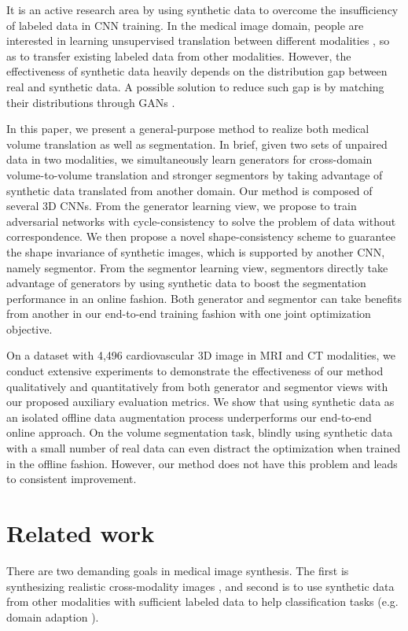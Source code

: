 \documentclass[10pt,twocolumn,letterpaper]{article}
\begin{document}
It is an active research area by using synthetic data to overcome the insufficiency of labeled data in CNN training. 
In the medical image domain, people are interested in learning unsupervised translation between different modalities \cite{kamnitsas2017unsupervised}, so as to transfer existing labeled data from other modalities. 
However, the effectiveness of synthetic data heavily depends on the distribution gap between real and synthetic data.
A possible solution to reduce such gap is by matching their distributions through GANs \cite{shrivastava2016learning,bousmalis2016unsupervised}.

In this paper, we present a general-purpose method to realize both medical volume translation as well as segmentation. In brief, given two sets of unpaired data in two modalities, we simultaneously learn generators for cross-domain volume-to-volume translation and stronger segmentors by taking advantage of synthetic data translated from another domain.
Our method is composed of several 3D CNNs. 
From the generator learning view, we propose to train adversarial networks with cycle-consistency \cite{zhu2017unpaired} to solve the problem of data without correspondence. 
We then propose a novel shape-consistency scheme to guarantee the shape invariance of synthetic images, which is supported by another CNN, namely segmentor. From the segmentor learning view, segmentors directly take advantage of generators by using synthetic data to boost the segmentation performance in an online fashion. Both generator and segmentor can take benefits from another in our end-to-end training fashion with one joint optimization objective.

On a dataset with 4,496 cardiovascular 3D image in MRI and CT modalities, we conduct extensive experiments to demonstrate the effectiveness of our method qualitatively and quantitatively from both generator and segmentor views with our proposed auxiliary evaluation metrics.
We show that using synthetic data as an isolated offline data augmentation process underperforms our end-to-end online approach. 
On the volume segmentation task, blindly using synthetic data with a small number of real data can even distract the optimization when trained in the offline fashion. However, our method does not have this problem and leads to consistent improvement. 



\section{Related work}
There are two demanding goals in medical image synthesis. The first is synthesizing realistic cross-modality images \cite{huang2017simultaneous,nie2016medical}, and second is to use synthetic data from other modalities with sufficient labeled data to help classification tasks (e.g. domain adaption \cite{kamnitsas2017unsupervised}).
\end{document}
